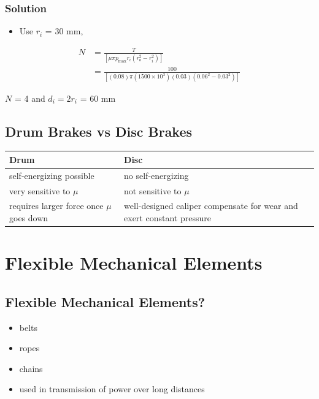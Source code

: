 \documentclass[
10pt,
a4paper,
openany,
svgnames,
]{book}
\begin{document}
\subsection*{Solution}
\label{sec:orgf229814}

\begin{itemize}
\item Use \(r_i\) = 30 mm,
\end{itemize}

\begin{align*}
    N &= \frac{T}{\left[ \mu \pi p_{\max} r_i \left( r_o^2 - r_i^2 \right) \right]} \\
        &= \frac{100}{\left[ (0.08)\pi(1500 \times 10^3)(0.03) \left( 0.06^2 - 0.03^2 \right) \right]}
\end{align*}

\(N\) = 4 and \(d_i = 2r_i\) = 60 mm

\section*{Drum Brakes vs Disc Brakes}
\label{sec:orge2ff8c4}

\begin{center}
\begin{tabular}{ll}
\hline
Drum & Disc\\
\hline
self-energizing possible & no self-energizing\\
very sensitive to \(\mu\) & not sensitive to \(\mu\)\\
requires larger force once \(\mu\) goes down & well-designed caliper compensate for wear and exert constant pressure\\
\end{tabular}
\end{center}

\chapter{Flexible Mechanical Elements}

\section*{Flexible Mechanical Elements?}
\label{sec:orgb16a243}

\begin{itemize}
\item belts
\item ropes
\item chains

\item used in transmission of power over long distances
\end{itemize}
\end{document}
